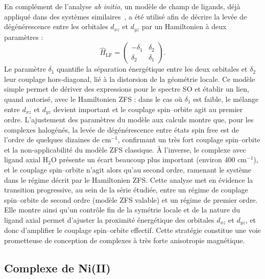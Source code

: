 \documentclass[12pt,a4paper]{report}
\numberwithin{equation}{section}
\begin{document}
En complément de l'analyse \textit{ab initio}, un modèle de champ de ligands, déjà appliqué dans des systèmes similaires~\cite{atanasov_detailed_2011,ruamps_giant_2013}, a été utilisé afin de décrire la levée de dégénérescence entre les orbitales \(d_{xz}\) et \(d_{yz}\) par un Hamiltonien à deux paramètres :
\begin{equation}
\hat{H}_{\mathrm{LF}} =
\begin{pmatrix}
-\delta_1 & \delta_2 \\
\delta_2 & \delta_1
\end{pmatrix}.
\end{equation}
Le paramètre \(\delta_1\) quantifie la séparation énergétique entre les deux orbitales et \(\delta_2\) leur couplage hors-diagonal, lié à la distorsion de la géométrie locale. 
Ce modèle simple permet de dériver des expressions pour le spectre SO et établir un lien, quand autorisé, avec le Hamiltonien ZFS : dans le cas où \(\delta_1\) est faible, le mélange entre \(d_{xz}\) et \(d_{yz}\) devient important et le couplage spin–orbite agit au premier ordre. 
L’ajustement des paramètres du modèle aux calculs montre que, pour les complexes halogénés, la levée de dégénérescence entre états spin free est de l’ordre de quelques dizaines de cm\(^{-1}\), confirmant un très fort couplage spin–orbite et la non-applicabilité du modèle ZFS classique. 
À l’inverse, le complexe avec ligand axial H\(_2\)O présente un écart beaucoup plus important (environ 400 cm\(^{-1}\)), et le couplage spin–orbite n’agit alors qu’au second ordre, ramenant le système dans le régime décrit par le Hamiltonien ZFS.
Cette analyse met en évidence la transition progressive, au sein de la série étudiée, entre un régime de couplage spin–orbite de second ordre (modèle ZFS valable) et un régime de premier ordre. 
Elle montre ainsi qu’un contrôle fin de la symétrie locale et de la nature du ligand axial permet d’ajuster la proximité énergétique des orbitales \(d_{xz}\) et \(d_{yz}\), et donc d’amplifier le couplage spin–orbite effectif. 
Cette stratégie constitue une voie prometteuse de conception de complexes à très forte anisotropie magnétique.

\subsection*{Complexe de Ni(II)}
\end{document}
